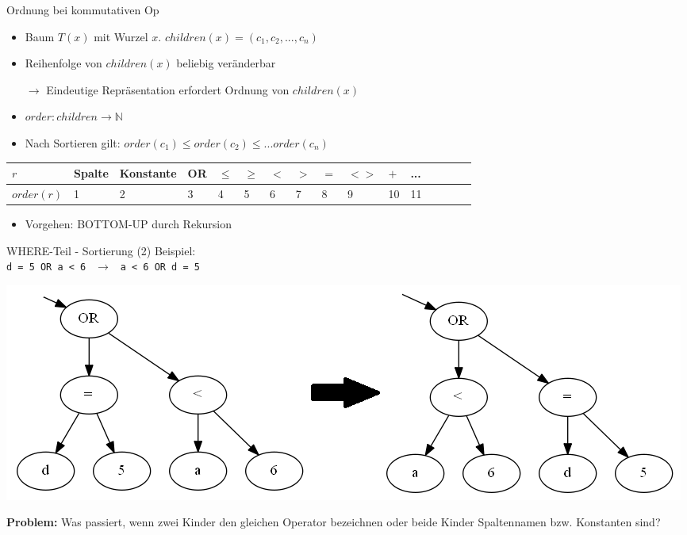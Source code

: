 \documentclass{beamer}
\begin{document}
\begin{frame}[fragile]{Ordnung bei kommutativen Op}
\begin{itemize}
\item Baum $T(x)$ mit Wurzel $x$. $children(x) = (c_1,c_2,...,c_n)$
\item Reihenfolge von $children(x)$ beliebig veränderbar
\item[$\to$] Eindeutige Repräsentation erfordert Ordnung von $children(x)$
\item $order: children \to \mathbb{N}$
\item Nach Sortieren gilt: $order(c_1) \leq order(c_2) \leq ... order(c_n)$
\end{itemize}
\begin{tabular}{|l|l|l|l|l|l|l|l|l|l|l|l|l|l|l|l|}
\hline
$r$ & Spalte & Konstante & OR & $\le$ & $\ge$ & $<$ & $>$ & $=$ & $<>$ & $+$ & ...\\\hline
$\textit{order}(r)$ & 1 & 2 & 3 & 4 & 5 & 6 & 7 & 8 & 9 & 10 & 11\\ 
\hline
\end{tabular}\newline
\vspace{3mm}
\begin{itemize}
\item Vorgehen: BOTTOM-UP durch Rekursion
\end{itemize}
\end{frame}

\begin{frame}[fragile]{WHERE-Teil - Sortierung (2)}
Beispiel:\\
\verb|d = 5 OR a < 6| $\ \ \to\ \ $ \verb|a < 6 OR d = 5|\\
\begin{center}
\includegraphics[scale=0.3]{sort_step1.png}
\end{center}
\textbf{Problem: }Was passiert, wenn zwei Kinder den gleichen Operator bezeichnen oder beide Kinder Spaltennamen bzw. Konstanten sind?
\end{frame}
\end{document}
